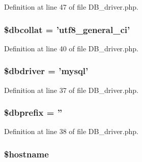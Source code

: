 Definition at line 47 of file D\-B\-\_\-driver.\-php.

\hypertarget{class_c_i___d_b__driver_a303eb205131e0266c2a57bcc6a34e80a}{
\subsubsection[{\$dbcollat}]{\setlength{\rightskip}{0pt plus 5cm}\$dbcollat = 'utf8\-\_\-general\-\_\-ci'}}\label{class_c_i___d_b__driver_a303eb205131e0266c2a57bcc6a34e80a}


Definition at line 40 of file D\-B\-\_\-driver.\-php.

\hypertarget{class_c_i___d_b__driver_a0cde2a16322a023d040aa7f725877597}{
\subsubsection[{\$dbdriver}]{\setlength{\rightskip}{0pt plus 5cm}\$dbdriver = 'mysql'}}\label{class_c_i___d_b__driver_a0cde2a16322a023d040aa7f725877597}


Definition at line 37 of file D\-B\-\_\-driver.\-php.

\hypertarget{class_c_i___d_b__driver_a81398da65aef92236c2bc2e0307f1fa4}{
\subsubsection[{\$dbprefix}]{\setlength{\rightskip}{0pt plus 5cm}\$dbprefix = ''}}\label{class_c_i___d_b__driver_a81398da65aef92236c2bc2e0307f1fa4}


Definition at line 38 of file D\-B\-\_\-driver.\-php.

\hypertarget{class_c_i___d_b__driver_a8bf9ffb42ed554b203b55377d1fc9aa4}{
\subsubsection[{\$hostname}]{\setlength{\rightskip}{0pt plus 5cm}\$hostname}}\label{class_c_i___d_b__driver_a8bf9ffb42ed554b203b55377d1fc9aa4}


